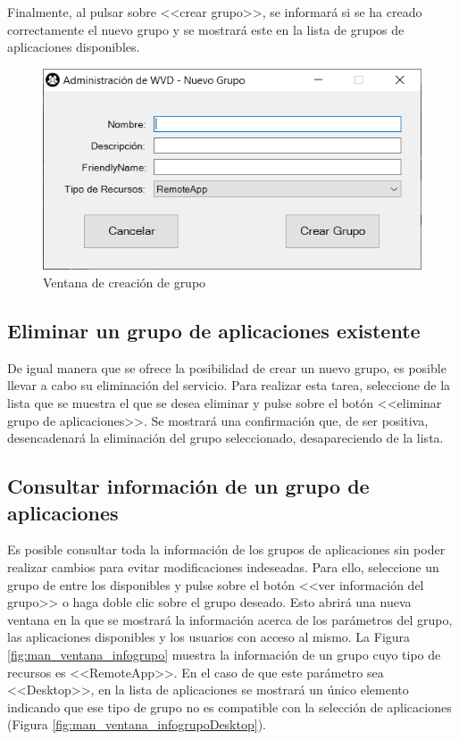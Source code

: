 Finalmente, al pulsar sobre <<crear grupo>>, se informará si se ha creado correctamente el nuevo grupo y se mostrará este en la lista de grupos de aplicaciones disponibles.

\begin{figure}[h]
  \centering
  \includegraphics[width=0.7\linewidth]{figures/images/script/ventana_creargrupo.PNG}
  \caption{Ventana de creación de grupo}
  \label{fig:man_ventana_creargrupo}
\end{figure}


\subsection{Eliminar un grupo de aplicaciones existente}
De igual manera que se ofrece la posibilidad de crear un nuevo grupo, es posible llevar a cabo su eliminación del servicio. Para realizar esta tarea, seleccione de la lista que se muestra el que se desea eliminar y pulse sobre el botón <<eliminar grupo de aplicaciones>>. Se mostrará una confirmación que, de ser positiva, desencadenará la eliminación del grupo seleccionado, desapareciendo de la lista.

\clearpage

\subsection{Consultar información de un grupo de aplicaciones}
Es posible consultar toda la información de los grupos de aplicaciones sin poder realizar cambios para evitar modificaciones indeseadas. Para ello, seleccione un grupo de entre los disponibles y pulse sobre el botón <<ver información del grupo>> o haga doble clic sobre el grupo deseado. Esto abrirá una nueva ventana en la que se mostrará la información acerca de los parámetros del grupo, las aplicaciones disponibles y los usuarios con acceso al mismo. La Figura \ref{fig:man_ventana_infogrupo} muestra la información de un grupo cuyo tipo de recursos es <<RemoteApp>>. En el caso de que este parámetro sea <<Desktop>>, en la lista de aplicaciones se mostrará un único elemento indicando que ese tipo de grupo no es compatible con la selección de aplicaciones (Figura \ref{fig:man_ventana_infogrupoDesktop}).

